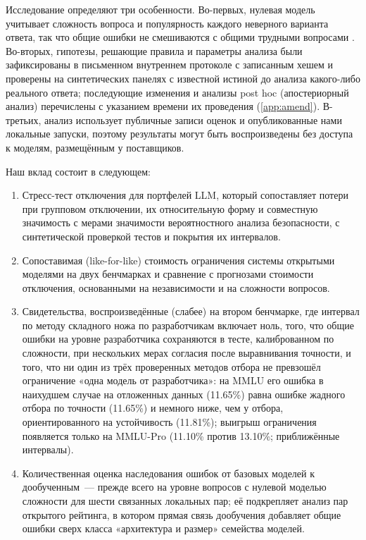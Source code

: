\documentclass[preprint,12pt,authoryear]{elsarticle}
\begin{document}
Исследование определяют три особенности. Во-первых, нулевая модель учитывает сложность вопроса и популярность каждого неверного варианта ответа, так что общие ошибки не смешиваются с общими трудными вопросами \citep{eckhardt1985}. Во-вторых, гипотезы, решающие правила и параметры анализа были зафиксированы в письменном внутреннем протоколе с записанным хешем и проверены на синтетических панелях с известной истиной до анализа какого-либо реального ответа; последующие изменения и анализы post hoc (апостериорный анализ) перечислены с указанием времени их проведения (\ref{app:amend}). В-третьих, анализ использует публичные записи оценок и опубликованные нами локальные запуски, поэтому результаты могут быть воспроизведены без доступа к моделям, размещённым у поставщиков.

Наш вклад состоит в следующем:
\begin{enumerate}
\item Стресс-тест отключения для портфелей LLM, который сопоставляет потери при групповом отключении, их относительную форму и совместную значимость с мерами значимости вероятностного анализа безопасности, с синтетической проверкой тестов и покрытия их интервалов.
\item Сопоставимая (like-for-like) стоимость ограничения системы открытыми моделями на двух бенчмарках и сравнение с прогнозами стоимости отключения, основанными на независимости и на сложности вопросов.
\item Свидетельства, воспроизведённые (слабее) на втором бенчмарке, где интервал по методу складного ножа по разработчикам включает ноль, того, что общие ошибки на уровне разработчика сохраняются в тесте, калиброванном по сложности, при нескольких мерах согласия после выравнивания точности, и того, что ни один из трёх проверенных методов отбора не превзошёл ограничение «одна модель от разработчика»: на MMLU его ошибка в наихудшем случае на отложенных данных (11.65\%) равна ошибке жадного отбора по точности (11.65\%) и немного ниже, чем у отбора, ориентированного на устойчивость (11.81\%); выигрыш ограничения появляется только на MMLU-Pro (11.10\% против 13.10\%; приближённые интервалы).
\item Количественная оценка наследования ошибок от базовых моделей к дообученным~--- прежде всего на уровне вопросов с нулевой моделью сложности для шести связанных локальных пар; её подкрепляет анализ пар открытого рейтинга, в котором прямая связь дообучения добавляет общие ошибки сверх класса «архитектура и размер» семейства моделей.
\end{enumerate}
\end{document}
